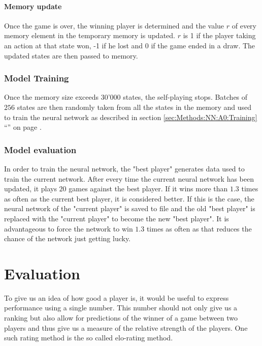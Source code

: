 \documentclass[12pt]{article}
\newcommand{\sectionref}[1]{section \ref{#1} ``\nameref{#1}'' on page \pageref{#1}}
\newcommand{\batchSize}{256}
\begin{document}
\paragraph{Memory update}\label{sec:memoryUpdate}
Once the game is over, the winning player is determined and the value \(r\) of every memory element in the temporary memory is updated. \(r\) is 1 if the player taking an action at that state won, -1 if he lost and 0 if the game ended in a draw. The updated states are then passed to memory.

\subsubsection{Model Training}
Once the memory size exceeds 30'000 states, the self-playing stops. Batches of \(\batchSize\) states are then randomly taken from all the states in the memory and used to train the neural network as described in \sectionref{sec:Methods:NN:A0:Training}.

\subsubsection{Model evaluation}\label{sec:modelEvaluation}
In order to train the neural network, the "best player" generates data used to train the current network.
After every time the current neural network has been updated, it plays \(20\) games against the best player. If it wins more than \(1.3\) times as often as the current best player, it is considered better. If this is the case, the neural network of the "current player" is saved to file and the old "best player" is replaced with the "current player" to become the new "best player". It is advantageous to force the network to win \(1.3\) times as often as that reduces the chance of the network just getting lucky. 
\section{Evaluation}\label{sec:evaluation}
To give us an idea of how good a player is, it would be useful to express performance using a single number. This number should not only give us a ranking but also allow for predictions of the winner of a game between two players and thus give us a measure of the relative strength of the players. One such rating method is the so called elo-rating method. \cite{elo1978rating}
\end{document}
